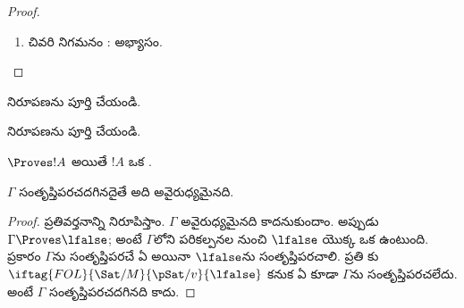 \documentclass[../../../include/open-logic-section]{subfiles}
\begin{document}
\begin{proof}
\begin{enumerate}
\item చివరి నిగమనం \Elim{\lnot}: అభ్యాసం.

\end{enumerate}
\end{proof}

\begin{prob}
 నిరూపణను పూర్తి చేయండి.
\end{prob}
\tagendprob

\begin{prob}
 నిరూపణను పూర్తి చేయండి.
\end{prob}
\tagendprob

\begin{cor}
$\Proves !A$ అయితే $!A$ ఒక .
\end{cor}

\begin{cor}
$\Gamma$ సంతృప్తిపరచదగినదైతే అది అవైరుధ్యమైనది.
\end{cor}

\begin{proof}
ప్రతివర్తనాన్ని నిరూపిస్తాం. $\Gamma$ అవైరుధ్యమైనది కాదనుకుందాం.
అప్పుడు $\Gamma \Proves \lfalse$; అంటే $\Gamma$లోని
 పరికల్పనల నుంచి $\lfalse$ యొక్క ఒక 
ఉంటుంది.  ప్రకారం $\Gamma$ను సంతృప్తిపరచే ఏ
అయినా $\lfalse$ను సంతృప్తిపరచాలి. ప్రతి
కు
$\iftag{FOL}{\Sat/{M}}{\pSat/{v}}{\lfalse}$ కనుక ఏ
 కూడా $\Gamma$ను
సంతృప్తిపరచలేదు. అంటే $\Gamma$ సంతృప్తిపరచదగినది కాదు.
\end{proof}
\end{document}
